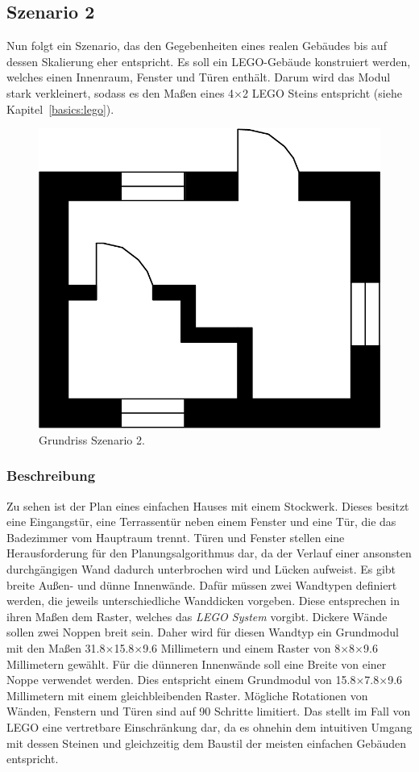 \subsection{Szenario 2}\label{scenarios:scenario2}
Nun folgt ein Szenario, das den Gegebenheiten eines realen Gebäudes bis auf dessen Skalierung eher entspricht.
Es soll ein LEGO-Gebäude konstruiert werden, welches einen Innenraum, Fenster und Türen enthält.
Darum wird das Modul stark verkleinert, sodass es den Maßen eines 4$\times$2 LEGO Steins entspricht (siehe Kapitel~\ref{basics:lego}).

\begin{figure}[ht]
  \centering
  \includegraphics[width=0.505\columnwidth]{fig/scenario2_storey_plan.png}
  \caption{Grundriss Szenario 2.}\label{fig:scenarios:Scenario2 Gebaeudeplan}
\end{figure}

\subsubsection*{Beschreibung}
Zu sehen ist der Plan eines einfachen Hauses mit einem Stockwerk.
Dieses besitzt eine Eingangstür, eine Terrassentür neben einem Fenster und eine Tür, die das Badezimmer vom Hauptraum trennt.
Türen und Fenster stellen eine Herausforderung für den Planungsalgorithmus dar, da der Verlauf einer ansonsten durchgängigen Wand dadurch unterbrochen wird und Lücken aufweist.
Es gibt breite Außen- und dünne Innenwände.
Dafür müssen zwei Wandtypen definiert werden, die jeweils unterschiedliche Wanddicken vorgeben.
Diese entsprechen in ihren Maßen dem Raster, welches das \textit{LEGO System} vorgibt.
Dickere Wände sollen zwei Noppen breit sein.
Daher wird für diesen Wandtyp ein Grundmodul mit den Maßen 31.8$\times$15.8$\times$9.6 Millimetern und einem Raster von 8$\times$8$\times$9.6 Millimetern gewählt.
Für die dünneren Innenwände soll eine Breite von einer Noppe verwendet werden.
Dies entspricht einem Grundmodul von 15.8$\times$7.8$\times$9.6 Millimetern mit einem gleichbleibenden Raster.
Mögliche Rotationen von Wänden, Fenstern und Türen sind auf 90\textdegree{} Schritte limitiert.
Das stellt im Fall von LEGO eine vertretbare Einschränkung dar, da es ohnehin dem intuitiven Umgang mit dessen Steinen und gleichzeitig dem Baustil der meisten einfachen Gebäuden entspricht.

